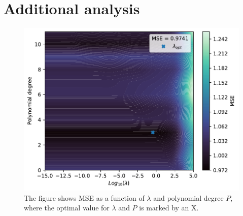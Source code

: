\section{Additional analysis}\label{ap:additional_analysis}

\begin{figure}
    \centering
    \includegraphics[width=0.9\linewidth]{project-1/latex/figures/lmbda_opt.pdf}
    \caption{The figure shows MSE as a function of $\lambda$ and polynomial degree $P$, where the optimal value for $\lambda$ and $P$ is marked by an X.}
    \label{fig:lmbda_opt}
\end{figure}
